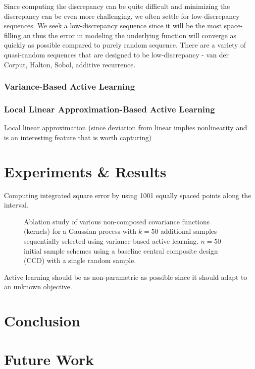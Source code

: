 \documentclass[conference]{IEEEtran}
\begin{document}
	Since computing the discrepancy can be quite difficult and minimizing the discrepancy  can be even more challenging, we often settle for low-discrepancy sequences. We seek a low-discrepancy sequence since it will be the most space-filling an thus the error in modeling the underlying function will converge as quickly as possible compared to purely random sequence. There are a variety of quasi-random sequences that are designed to be low-discrepancy - van der Corput, Halton, Sobol, additive recurrence.

	\subsubsection{Variance-Based Active Learning}
	
	\subsubsection{Local Linear Approximation-Based Active Learning}
	Local linear approximation (since deviation from linear implies nonlinearity and is an interesting feature that is worth capturing)
	    
	\section{Experiments \& Results}
	\label{sec:experiments-results}
	
	Computing integrated square error by using 1001 equally spaced points along the interval.
	
	\begin{figure}[ht]
		\centering
		
		\caption{Ablation study of various non-composed covariance functions (kernels) for a Gaussian process with $k=50$ additional samples sequentially selected using variance-based active learning. $n=50$ initial sample schemes using a baseline central composite design (CCD) with a single random sample.}
	\end{figure}
	
	
	Active learning should be as non-parametric as possible since it should adapt to an unknown objective.
	
	\section{Conclusion}
	\label{sec:conclusion}
	
	
	\section{Future Work}
	\label{sec:future-work}
	
\end{document}
